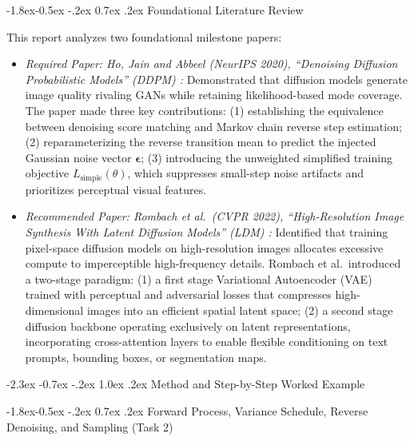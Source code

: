 \documentclass[10pt,a4paper]{article}
\makeatletter
\renewcommand\section{\@startsection {section}{1}{\z@}%
                                   {-2.3ex \@plus -0.7ex \@minus -.2ex}%
                                   {1.0ex \@plus.2ex}%
                                   {\normalfont\large\bfseries}}
\renewcommand\subsection{\@startsection{subsection}{2}{\z@}%
                                     {-1.8ex\@plus -0.5ex \@minus -.2ex}%
                                     {0.7ex \@plus .2ex}%
                                     {\normalfont\normalsize\bfseries}}
\makeatother
\begin{document}
\subsection{Foundational Literature Review}
\label{sec:bg_lit_review}

This report analyzes two foundational milestone papers:
\begin{itemize}[leftmargin=1.5em, itemsep=0.3em]
    \item \textit{Required Paper: Ho, Jain and Abbeel (NeurIPS 2020), ``Denoising Diffusion Probabilistic Models'' (DDPM) \cite{ho2020denoising}:}
    Demonstrated that diffusion models generate image quality rivaling GANs while retaining likelihood-based mode coverage. The paper made three key contributions:
    (1) establishing the equivalence between denoising score matching and Markov chain reverse step estimation;
    (2) reparameterizing the reverse transition mean to predict the injected Gaussian noise vector $\bm{\epsilon}$;
    (3) introducing the unweighted simplified training objective $L_{\text{simple}}(\theta)$, which suppresses small-step noise artifacts and prioritizes perceptual visual features.

    \item \textit{Recommended Paper: Rombach et al.\ (CVPR 2022), ``High-Resolution Image Synthesis With Latent Diffusion Models'' (LDM) \cite{rombach2022high}:}
    Identified that training pixel-space diffusion models on high-resolution images allocates excessive compute to imperceptible high-frequency details. Rombach et al.\ introduced a two-stage paradigm:
    (1) a first stage Variational Autoencoder (VAE) trained with perceptual and adversarial losses that compresses high-dimensional images into an efficient spatial latent space;
    (2) a second stage diffusion backbone operating exclusively on latent representations, incorporating cross-attention layers to enable flexible conditioning on text prompts, bounding boxes, or segmentation maps.
\end{itemize}

\section{Method and Step-by-Step Worked Example}

\subsection{Forward Process, Variance Schedule, Reverse Denoising, and Sampling (Task 2)}
\label{sec:method_ddpm_theory}
\end{document}
